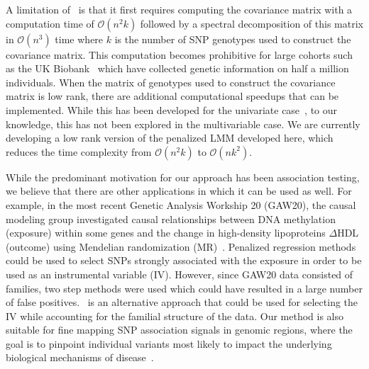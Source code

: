 
A limitation of \ggmix ~is that it first requires computing the covariance matrix with a computation time of $\mathcal{O}(n^2k)$ followed by a spectral decomposition of this matrix in $\mathcal{O}(n^3)$ time where $k$ is the number of SNP genotypes used to construct the covariance matrix. This computation becomes prohibitive for large cohorts such as the UK Biobank~\citep{allen2012uk} which have collected genetic information on half a million individuals. When the matrix of genotypes used to construct the covariance matrix is low rank, there are additional computational speedups that can be implemented. While this has been developed for the univariate case~\citep{lippert2011fast}, to our knowledge, this has not been explored in the multivariable case. We are currently developing a low rank version of the penalized LMM developed here, which reduces the time complexity from $\mathcal{O}(n^2k)$ to $\mathcal{O}(nk^2)$.




While the predominant motivation for our approach has been association testing, we believe that there are other applications in which it can be used as well. 
For example, in the most recent Genetic Analysis Workship 20 (GAW20),  the causal modeling group investigated causal
relationships between DNA methylation (exposure) within some genes
and the change in high-density lipoproteins $\Delta$HDL (outcome) using Mendelian randomization (MR)~\citep{davey2003mendelian}. 
Penalized regression methods could be used to select SNPs strongly associated with the exposure in order to be used as an instrumental variable (IV). 
However, since GAW20 data consisted of families, two step methods were used which could have resulted in a large number of false positives. \ggmix~is an alternative approach that could be used for selecting the IV while accounting for the familial structure of the data. 
Our method is also suitable for fine mapping SNP association signals in genomic regions, where the goal is to pinpoint individual variants most likely to impact the underlying biological mechanisms of disease~\citep{spain2015strategies}.
